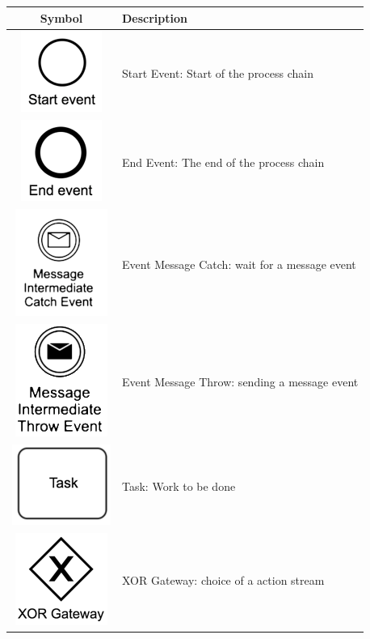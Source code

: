 \documentclass[]{book}
\begin{document}
\begin{longtable}[]{@{}cl@{}}
\toprule
Symbol & Description\tabularnewline
\midrule
\endhead
\includegraphics{images/start-event.png} & Start Event: Start of the process chain\tabularnewline
\includegraphics{images/end-event.png} & End Event: The end of the process chain\tabularnewline
\includegraphics{images/event-message-catch.png} & Event Message Catch: wait for a message event\tabularnewline
\includegraphics{images/event-message-throw.png} & Event Message Throw: sending a message event\tabularnewline
\includegraphics{images/task.png} & Task: Work to be done\tabularnewline
\includegraphics{images/xor-gateway.png} & XOR Gateway: choice of a action stream\tabularnewline

\end{longtable}
\end{document}
